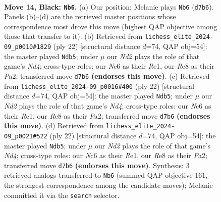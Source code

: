 \documentclass[11pt]{article}
\begin{document}
\clearpage

\begin{figure}[p]\centering
\begin{subfigure}{0.46\textwidth}\centering
\resizebox{\linewidth}{!}{%
\newchessgame
\chessboard[
  setfen={r1bqr1k1/pp1nbppp/2n1p3/8/2Pp2P1/1P3N1B/P2P1PKP/RNBQR3 b - - 3 14},
  showmover=false,
  pgfstyle=straightmove, color=movearrow, markmove={d7-b6}
]}
\caption{}
\end{subfigure}\hfill
\begin{subfigure}{0.46\textwidth}\centering
\resizebox{\linewidth}{!}{%
\newchessgame
\chessboard[
  setfen={r1bqr1k1/1pp2pbp/3p1np1/p1n5/2PNP3/2N3PP/PP3PB1/R1BQR1K1 w - - 0 12},
  showmover=false,
  pgfstyle=straightmove, color=movearrow, markmove={d4-b5}
]}
\caption{}
\end{subfigure}
\\[4pt]
\begin{subfigure}{0.46\textwidth}\centering
\resizebox{\linewidth}{!}{%
\newchessgame
\chessboard[
  setfen={r1bqr1k1/1pp2pbp/3p1np1/p1n5/2PNP3/2N3PP/PP3PB1/R1BQR1K1 w - - 1 12},
  showmover=false,
  pgfstyle=straightmove, color=movearrow, markmove={d4-b5}
]}
\caption{}
\end{subfigure}\hfill
\begin{subfigure}{0.46\textwidth}\centering
\resizebox{\linewidth}{!}{%
\newchessgame
\chessboard[
  setfen={r1bqr1k1/1pp2pbp/3p1np1/p1n5/2PNP3/2N3PP/PP3PB1/R1BQR1K1 w - - 0 12},
  showmover=false,
  pgfstyle=straightmove, color=movearrow, markmove={d4-b5}
]}
\caption{}
\end{subfigure}
\caption{\textbf{Move 14, Black: \texttt{Nb6}.} (a) Our position; Melanie plays \texttt{Nb6} (\texttt{d7b6}). Panels (b)--(d) are the retrieved master positions whose correspondence most drove this move (highest QAP objective among those that transfer to it). (b) Retrieved from \texttt{lichess\_elite\_2024-09\_p0010\#1829} (ply 22) [structural distance $d$=74, QAP obj=54]: the master played \texttt{Ndb5}; under $\mu$ our \emph{Nd2} plays the role of that game's \emph{Nd4}; cross-type roles: our \emph{N}c6 as their \emph{R}e1, our \emph{R}e8 as their \emph{P}a2; transferred move \texttt{d7b6} \textbf{(endorses this move)}. (c) Retrieved from \texttt{lichess\_elite\_2024-09\_p0016\#400} (ply 22) [structural distance $d$=74, QAP obj=54]: the master played \texttt{Ndb5}; under $\mu$ our \emph{Nd2} plays the role of that game's \emph{Nd4}; cross-type roles: our \emph{N}c6 as their \emph{R}e1, our \emph{R}e8 as their \emph{P}a2; transferred move \texttt{d7b6} \textbf{(endorses this move)}. (d) Retrieved from \texttt{lichess\_elite\_2024-09\_p0021\#522} (ply 22) [structural distance $d$=74, QAP obj=54]: the master played \texttt{Ndb5}; under $\mu$ our \emph{Nd2} plays the role of that game's \emph{Nd4}; cross-type roles: our \emph{N}c6 as their \emph{R}e1, our \emph{R}e8 as their \emph{P}a2; transferred move \texttt{d7b6} \textbf{(endorses this move)}. Synthesis: 3 retrieved analogs transferred to \texttt{Nb6} (summed QAP objective 161, the strongest correspondence among the candidate moves); Melanie committed it via the \texttt{search} selector.}
\label{fig:thought-m27}
\end{figure}
\end{document}
